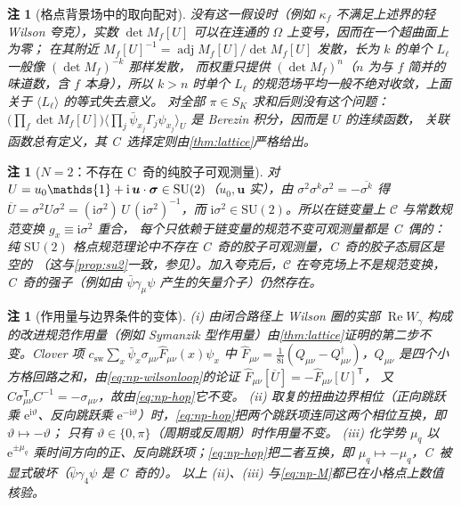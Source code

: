 \documentclass[UTF8,a4paper,11pt,fontset=fandol]{ctexart}
\let\amsmathbb\mathbb
\renewcommand{\mathbb}[1]{\ifx1#1\mathds{1}\else\amsmathbb{#1}\fi}
\theoremstyle{cplain}
\theoremstyle{cdefinition}
\theoremstyle{cremark}
\newtheorem{remark}[theorem]{注}
\numberwithin{equation}{section}
\DeclareMathOperator{\Real}{Re}
\newcommand{\tp}{\mathsf{T}}                         %
\newcommand{\Cop}{\mathcal{C}}                       %
\newcommand{\ii}{\mathrm{i}}                        %
\newcommand{\ee}{\mathrm{e}}                        %
\begin{document}
\begin{remark}[格点背景场中的取向配对]
没有这一假设时（例如 $\kappa_f$ 不满足上述界的轻 Wilson 夸克），实数 $\det M_f[U]$ 可以在连通的 $\Omega$ 上变号，因而在一个超曲面上为零；
在其附近 $M_f[U]^{-1}=\operatorname{adj}M_f[U]/\det M_f[U]$ 发散，长为 $k$ 的单个 $L_\ell$ 一般像 $(\det M_f)^{-k}$ 那样发散，
而权重只提供 $(\det M_f)^{n}$（$n$ 为与 $f$ 简并的味道数，含 $f$ 本身），所以 $k>n$ 时单个 $L_\ell$ 的规范场平均一般不绝对收敛，上面关于 $\langle L_\ell\rangle$ 的等式失去意义。
对全部 $\pi\in S_K$ 求和后则没有这个问题：$\bigl(\prod_f\det M_f[U]\bigr)\bigl\langle\prod_j\bar\psi_{x_j}\Gamma_j\psi_{x_j}\bigr\rangle_U$ 是 Berezin 积分，因而是 $U$ 的连续函数，
关联函数总有定义，其 C~选择定则由\cref{thm:lattice}严格给出。
\end{remark}

\begin{remark}[$N=2$：不存在 C~奇的纯胶子可观测量]\label{rem:np-su2}
对 $U=u_0\mathbb 1+\ii\,\boldsymbol u\cdot\boldsymbol\sigma\in\mathrm{SU}(2)$（$u_0,\boldsymbol u$ 实），由 $\sigma^2\sigma^k\sigma^2=-\overline{\sigma^k}$ 得
$\overline U=\sigma^2U\sigma^2=(\ii\sigma^2)\,U\,(\ii\sigma^2)^{-1}$，而 $\ii\sigma^2\in\mathrm{SU}(2)$。所以在链变量上 $\Cop$ 与常数规范变换 $g_x\equiv\ii\sigma^2$ 重合，
\emph{每个}只依赖于链变量的规范不变可观测量都是 C~偶的：纯 $\mathrm{SU}(2)$ 格点规范理论中不存在 C~奇的胶子可观测量，C~奇的胶子态扇区是空的
（这与\cref{prop:su2}一致，参见\cite{daVeigaOCarroll2026}）。加入夸克后，$\Cop$ 在夸克场上不是规范变换，C~奇的强子（例如由 $\bar\psi\gamma_\mu\psi$ 产生的矢量介子）仍然存在。
\end{remark}

\begin{remark}[作用量与边界条件的变体]\label{rem:np-lattice-variants}
(i) 由闭合路径上 Wilson 圈的实部 $\Real W_\gamma$ 构成的改进规范作用量（例如 Symanzik 型作用量）由\cref{thm:lattice}证明的第二步不变。Clover 项 $c_{\mathrm{sw}}\sum_x\bar\psi_x\sigma_{\mu\nu}\hat F_{\mu\nu}(x)\psi_x$ 中
$\hat F_{\mu\nu}=\frac1{8\ii}(Q_{\mu\nu}-Q_{\mu\nu}^\dagger)$，$Q_{\mu\nu}$ 是四个小方格回路之和，由\cref{eq:np-wilsonloop}的论证 $\hat F_{\mu\nu}[\overline U]=-\hat F_{\mu\nu}[U]^{\tp}$，
又 $C\sigma_{\mu\nu}^{\tp}C^{-1}=-\sigma_{\mu\nu}$，故由\cref{eq:np-hop}它不变。
(ii) 取复的扭曲边界相位（正向跳跃乘 $\ee^{\ii\vartheta}$、反向跳跃乘 $\ee^{-\ii\vartheta}$）时，\cref{eq:np-hop}把两个跳跃项连同这两个相位互换，即 $\vartheta\mapsto-\vartheta$；
只有 $\vartheta\in\{0,\pi\}$（周期或反周期）时作用量不变。
(iii) 化学势 $\mu_q$ 以 $\ee^{\pm\mu_q}$ 乘时间方向的正、反向跳跃项；\cref{eq:np-hop}把二者互换，即 $\mu_q\mapsto-\mu_q$，C~被显式破坏（$\bar\psi\gamma_4\psi$ 是 C~奇的）。
以上 (ii)、(iii) 与\cref{eq:np-M}都已在小格点上数值核验。
\end{remark}
\end{document}
